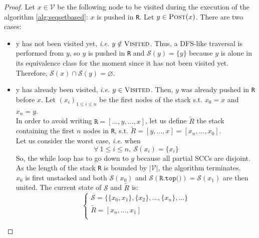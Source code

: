 \documentclass[a4 paper, 12pt]{article}
\begin{document}
\begin{proof}
    Let $x \in \mathcal{V}$ be the following node to be visited during the execution of the algorithm \ref{alg:seqsetbased}: $x$ is pushed in \texttt{R}. Let $y \in \textsc{Post}(x)$. There are two cases:\\
    \begin{itemize}
        \item y has not been visited yet, \textit{i.e.} $y \notin \textsc{Visited}$. Thus, a DFS-like traversal is performed from $y$, so $y$ is pushed in \texttt{R} and $\mathcal{S}(y) = \{y\}$ because $y$ is alone in its equivalence class for the moment since it has not been visited yet.\\
        Therefore, $\mathcal{S}(x) \cap \mathcal{S}(y) = \varnothing$.

        \item y has already been visited, \textit{i.e.} $y \in \textsc{Visited}$. Then, $y$ was already pushed in \texttt{R} before $x$. Let $(x_i)_{1\leq i \leq n}$ be the first nodes of the stack s.t. $x_0 = x$ and $x_n = y$.\\
        In order to avoid writing $\texttt{R} = [\ldots, y, \ldots, x]$, let us define $\widetilde{R}$ the stack containing the first $n$ nodes in \texttt{R}, s.t. $\widetilde{R} = [y, \ldots, x] = [x_n, \ldots, x_0]$.\\
        Let us consider the worst case, \textit{i.e.} when
        \begin{equation*}
            \forall~1 \leq i \leq n,~\mathcal{S}(x_i) = \{x_i\}
        \end{equation*}
        So, the while loop has to go down to $y$ because all partial SCCs are disjoint. As the length of the stack \texttt{R} is bounded by $|\mathcal{V}|$, the algorithm terminates.\\
        $x_0$ is first unstacked and both $\mathcal{S}(x_0)$ and $\mathcal{S}(\texttt{R.top()}) = \mathcal{S}(x_1)$ are then united. The current state of $\mathcal{S}$ and $\widetilde{R}$ is:
        \begin{equation*}
            \left\{
                \begin{array}{l}
                    \mathcal{S} = \{\{x_0, x_1\}, \{x_2\}, \ldots, \{x_n\}, \ldots\}\\
                    \widetilde{R} = [x_n, \ldots, x_1]\\
                \end{array}
            \right.
        \end{equation*}

\end{itemize}
\end{proof}
\end{document}
